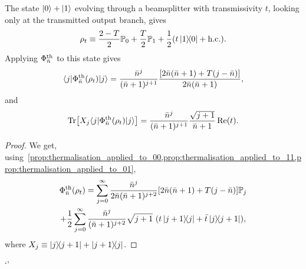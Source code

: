 \documentclass[12pt]{report}
\newcommand{\PP}{\mathbb{P}}
\begin{document}
\begin{prop}
	The state $\ket0+\ket1$ evolving through a beamsplitter with transmissivity $t$, looking only at the transmitted output branch, gives
	\begin{equation}
		\rho_t
		\equiv
		\frac{2-T}{2} \PP_0
		+ \frac{T}{2} \PP_1
		+ \frac12 (t \ketbra{1}{0} + \mathrm{h.c.}).
	\end{equation}
	Applying $\Phi^{\rm th}_{\bar n}$ to this state gives
	\begin{equation}
	\begin{gathered}
		\langle j|\Phi^{\rm th}_{\bar n}(\rho_t)|j\rangle
		= \frac{\bar n^j}{(\bar n + 1)^{j+1}}
		\frac{[2\bar n(\bar n+1) + T(j-\bar n)]}{2\bar n(\bar n+1)},
	\end{gathered}
	\end{equation}
	and
	\begin{equation}
		\Tr[X_{j}\langle j|\Phi^{\rm th}_{\bar n}(\rho_t)|j\rangle]
		= \frac{\bar n^j}{(\bar n+1)^{j+1}} \frac{\sqrt{j+1}}{\bar n+ 1}
		\Re(t).
	\end{equation}
\end{prop}
\begin{proof}
	We get, using~\cref{prop:thermalisation_applied_to_00,prop:thermalisation_applied_to_11,prop:thermalisation_applied_to_01},
	\begin{equation}
	\begin{gathered}
		\Phi_{\bar n}^{\rm th}(\rho_t)
		= \sum_{j=0}^\infty
		\frac{\bar n^j}{2\bar n(\bar n + 1)^{j+2}}
		[2\bar n(\bar n+1) + T(j-\bar n)]
		\PP_j \\
		+ \frac{1}{2}\sum_{j=0}^\infty
		\frac{\bar n^j}{(\bar n + 1)^{j+2}} \sqrt{j+1} \,\,
		(t\ketbra{j+1}{j} + \bar t \ketbra{j}{j+1}),
	\end{gathered}
	\end{equation}
	where $X_j \equiv \ketbra{j}{j+1} + \ketbra{j+1}{j}$.
\end{proof}`'
\end{document}
